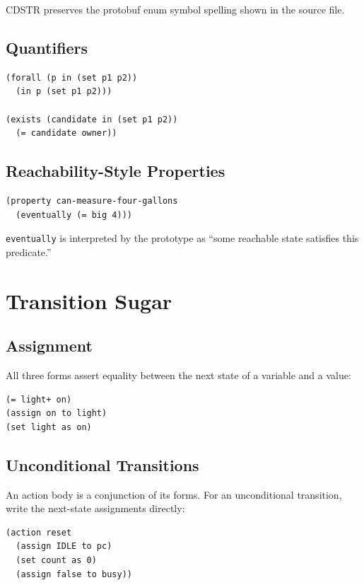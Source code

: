 \documentclass[11pt]{article}
\begin{document}
CDSTR preserves the protobuf enum symbol spelling shown in the source file.

\subsection{Quantifiers}

\begin{lstlisting}[language=CDSTR]
(forall (p in (set p1 p2))
  (in p (set p1 p2)))

(exists (candidate in (set p1 p2))
  (= candidate owner))
\end{lstlisting}

\subsection{Reachability-Style Properties}

\begin{lstlisting}[language=CDSTR]
(property can-measure-four-gallons
  (eventually (= big 4)))
\end{lstlisting}

\texttt{eventually} is interpreted by the prototype as ``some reachable state
satisfies this predicate.''

\section{Transition Sugar}

\subsection{Assignment}

All three forms assert equality between the next state of a variable and a
value:

\begin{lstlisting}[language=CDSTR]
(= light+ on)
(assign on to light)
(set light as on)
\end{lstlisting}

\subsection{Unconditional Transitions}

An action body is a conjunction of its forms.  For an unconditional transition,
write the next-state assignments directly:

\begin{lstlisting}[language=CDSTR]
(action reset
  (assign IDLE to pc)
  (set count as 0)
  (assign false to busy))
\end{lstlisting}
\end{document}
